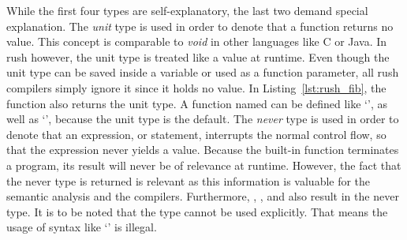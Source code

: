 While the first four types are self-explanatory, the last two demand special explanation.
The \emph{unit} type is used in order to denote that a function returns no value.
This concept is comparable to \emph{void} in other languages like C or Java.
In rush however, the unit type is treated like a value at runtime.
Even though the unit type can be saved inside a variable or used as a function parameter, all rush compilers simply ignore it since it holds no value.
In Listing~\ref{lst:rush_fib}, the  function also returns the unit type.
A function named  can be defined like `', as well as `', because the unit type is the default.
The \emph{never} type is used in order to denote that an expression, or statement, interrupts the normal control flow, so that the expression never yields a value.
Because the built-in  function terminates a program, its result will never be of relevance at runtime.
However, the fact that the never type is returned is relevant as this information is valuable for the semantic analysis and the compilers.
Furthermore, , , and  also result in the never type.
It is to be noted that the type cannot be used explicitly.
That means the usage of syntax like `' is illegal.

